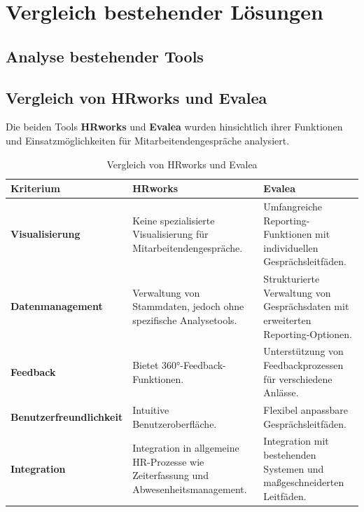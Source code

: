 \section{Vergleich bestehender Lösungen}
\subsection{Analyse bestehender Tools}
\subsection{Vergleich von HRworks und Evalea}
Die beiden Tools \textbf{HRworks} und \textbf{Evalea} wurden hinsichtlich ihrer Funktionen und Einsatzmöglichkeiten für Mitarbeitendengespräche analysiert.

\begin{table}[h!]
\centering
\caption{Vergleich von HRworks und Evalea}
\label{tab:vergleich_hrworks_evalea}
\begin{tabularx}{\textwidth}{|X|X|X|}
\hline
\textbf{Kriterium}              & \textbf{HRworks}                                                                 & \textbf{Evalea}                                                                 \\\hline
\textbf{Visualisierung}         & Keine spezialisierte Visualisierung für Mitarbeitendengespräche.                 & Umfangreiche Reporting-Funktionen mit individuellen Gesprächsleitfäden.         \\\hline
\textbf{Datenmanagement}        & Verwaltung von Stammdaten, jedoch ohne spezifische Analysetools.                 & Strukturierte Verwaltung von Gesprächsdaten mit erweiterten Reporting-Optionen. \\\hline
\textbf{Feedback}               & Bietet 360°-Feedback-Funktionen.                                                 & Unterstützung von Feedbackprozessen für verschiedene Anlässe.                   \\\hline
\textbf{Benutzerfreundlichkeit} & Intuitive Benutzeroberfläche.                                                    & Flexibel anpassbare Gesprächsleitfäden.                                         \\\hline
\textbf{Integration}            & Integration in allgemeine HR-Prozesse wie Zeiterfassung und Abwesenheitsmanagement. & Integration mit bestehenden Systemen und maßgeschneiderten Leitfäden.          \\\hline
\end{tabularx}
\end{table}

